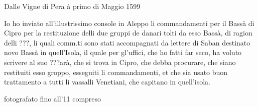 \stopcifrato

Dalle Vigne di Pera à primo di Maggio 1599

Io ho inviato all'illustrissimo console in Aleppo li commandamenti per
il Bassà di Cipro per la restituzione delli due gruppi de danari tolti
da  esso Bassà,  di  ragion delli  ???,  li quali  comm.ti sono  stati
accompagnati da lettere di  Saban destinato novo Bassà in quell'Isola,
il quale per  gl'uffici, che ho fatti far seco,  ha voluto scrivere al
suo  ???arà, che si  trova in  Cipro, che  debba procurare,  che siano
restituiti esso  groppo, esseguiti li commandamenti, et  che sia usato
buon  trattamento  a tutti  li  vassalli  Venetiani,  che capitano  in
quell'isola.


fotografato fino all'11 compreso
